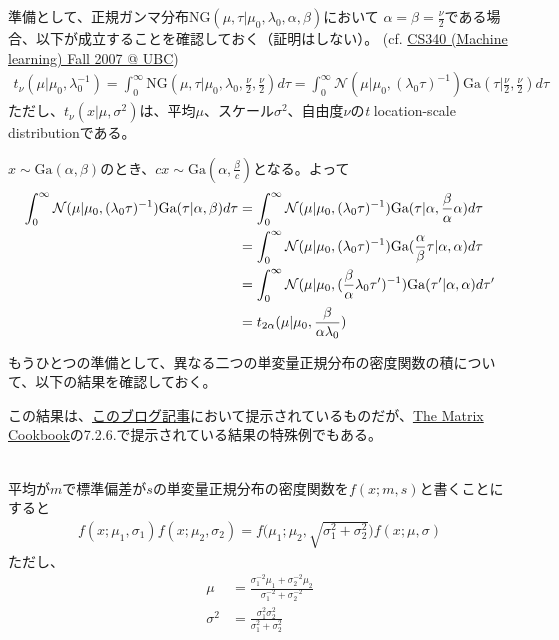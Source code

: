 \documentclass[aspectratio=169,unicode,dvipdfmx,14pt]{beamer}
\begin{document}
\begin{frame}
\FontMath
準備として、正規ガンマ分布$\mbox{NG}(\mu,\tau|\mu_0, \lambda_0, \alpha, \beta)$において
$\alpha=\beta=\frac{\nu}{2}$である場合、以下が成立することを確認しておく（証明はしない）。
(cf. \href{https://www.cs.ubc.ca/~murphyk/Teaching/CS340-Fall07/reading/NG.pdf}{CS340 (Machine learning) Fall 2007 @ UBC})
\begin{align}
t_\nu (\mu|\mu_0,\lambda_0^{-1}) = \int_0^\infty \mbox{NG}(\mu,\tau|\mu_0, \lambda_0, \frac{\nu}{2}, \frac{\nu}{2}) d\tau
= \int_0^\infty \mathcal{N}(\mu|\mu_0,(\lambda_0\tau)^{-1})\mbox{Ga}(\tau|\frac{\nu}{2},\frac{\nu}{2}) d\tau
\end{align}
ただし、$t_\nu (x|\mu,\sigma^2)$は、平均$\mu$、スケール$\sigma^2$、自由度$\nu$の\textit{t} location-scale distributionである。

$x \sim \mbox{Ga}(\alpha,\beta)$のとき、$cx \sim \mbox{Ga}(\alpha,\frac{\beta}{c})$となる。よって
\begin{align}
\int_0^\infty \mathcal{N}(\mu|\mu_0,(\lambda_0\tau)^{-1})\mbox{Ga}(\tau|\alpha,\beta) d\tau
& = \int_0^\infty \mathcal{N}(\mu|\mu_0,(\lambda_0\tau)^{-1})\mbox{Ga}(\tau|\alpha,\frac{\beta}{\alpha}\alpha) d\tau
\notag \\ & =
\int_0^\infty \mathcal{N}(\mu|\mu_0,(\lambda_0\tau)^{-1})\mbox{Ga}(\frac{\alpha}{\beta}\tau|\alpha,\alpha) d\tau
\notag \\ & =
\int_0^\infty \mathcal{N}(\mu|\mu_0,(\frac{\beta}{\alpha}\lambda_0\tau^\prime)^{-1})\mbox{Ga}(\tau^\prime|\alpha,\alpha) d\tau^\prime
\notag \\ & =
t_{2\alpha}(\mu|\mu_0,\frac{\beta}{\alpha\lambda_0})
\label{eq:t-dist}
\end{align}
\end{frame}

\begin{frame}
\FontMath
もうひとつの準備として、異なる二つの単変量正規分布の密度関数の積について、以下の結果を確認しておく。

この結果は、\href{https://www.johndcook.com/blog/2012/10/29/product-of-normal-pdfs/}{このブログ記事}において提示されているものだが、\href{https://www.ics.uci.edu/~welling/teaching/KernelsICS273B/MatrixCookBook.pdf}{The Matrix Cookbook}の7.2.6.で提示されている結果の特殊例でもある。

\ \\
平均が$m$で標準偏差が$s$の単変量正規分布の密度関数を$f(x;m,s)$と書くことにすると
\begin{align}
f(x;\mu_1,\sigma_1)f(x;\mu_2,\sigma_2) 
= f\Big(\mu_1;\mu_2,\sqrt{\sigma_1^2+\sigma_2^2}\Big) f(x;\mu,\sigma)
\end{align}
ただし、
\begin{align}
\mu & =\frac{\sigma_1^{-2}\mu_1 + \sigma_2^{-2}\mu_2}{\sigma_1^{-2} + \sigma_2^{-2}} \\
\sigma^2 &= \frac{\sigma_1^2\sigma_2^2}{\sigma_1^2 + \sigma_2^2}
\end{align}
\end{frame}
\end{document}
